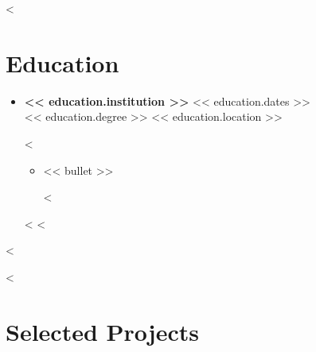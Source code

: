 \documentclass[a4paper,10pt]{article}
\newcommand{\resumeSubheading}[4]{%
    \item
    \textbf{#1}\hfill
    {\small\color{cvmuted}#2}\\
    {\small #3}\hfill
    {\small\color{cvmuted}#4}
    \vspace{-2pt}
}
\newcommand{\resumeItem}[1]{%
    \item {\small #1}
}
\newcommand{\resumeSubHeadingListStart}{
    \begin{itemize}[leftmargin=0pt,label={},itemsep=3pt plus 1pt minus 1.5pt]
}
\newcommand{\resumeSubHeadingListEnd}{
    \end{itemize}
}
\newcommand{\resumeItemListStart}{
    \begin{itemize}
}
\newcommand{\resumeItemListEnd}{
    \end{itemize}\vspace{-3pt}
}
\begin{document}

<%
\section{Education}

\resumeSubHeadingListStart
<%
    \resumeSubheading
        {<< education.institution >>}
        {<< education.dates >>}
        {<< education.degree >>}
        {<< education.location >>}
<%
    \resumeItemListStart
<%
        \resumeItem{<< bullet >>}
<%
    \resumeItemListEnd
<%
<%
\resumeSubHeadingListEnd
<%


<%
\section{Selected Projects}
\end{document}
